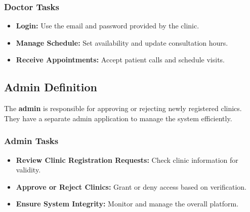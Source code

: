 \documentclass[12pt]{report}
\begin{document}
\subsubsection{\textbf{Doctor Tasks}}
\begin{itemize}
	\item \textbf{Login:} Use the email and password provided by the clinic.
	\item \textbf{Manage Schedule:} Set availability and update consultation hours.
	\item \textbf{Receive Appointments:} Accept patient calls and schedule visits.
\end{itemize}

\vspace{0.5cm}


\subsection{\textbf{Admin Definition}}

\noindent The \textbf{admin} is responsible for approving or rejecting newly registered clinics. They have a separate admin application to manage the system efficiently.

\subsubsection{\textbf{Admin Tasks}}
\begin{itemize}
	\item \textbf{Review Clinic Registration Requests:} Check clinic information for validity.
	\item \textbf{Approve or Reject Clinics:} Grant or deny access based on verification.
	\item \textbf{Ensure System Integrity:} Monitor and manage the overall platform.
\end{itemize}
\end{document}
